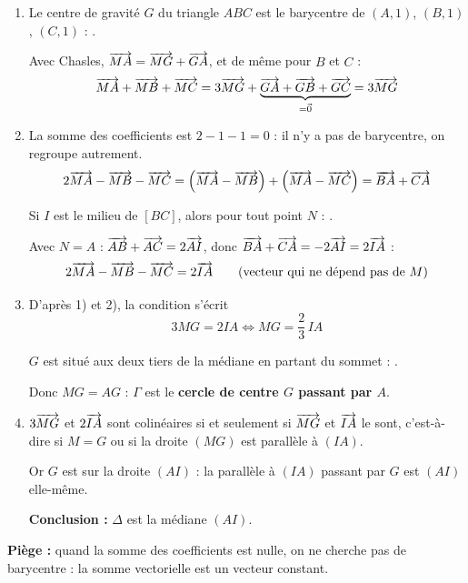 \begin{center}
\end{center}
\begin{enumerate}[itemsep=14pt]
  \item
  \begin{prop}
  Le centre de gravité $G$ du triangle $ABC$ est le barycentre de $(A,1)$, $(B,1)$, $(C,1)$ : .
  \end{prop}
  Avec Chasles, $\overrightarrow{MA}=\overrightarrow{MG}+\overrightarrow{GA}$, et de même pour $B$ et $C$ :
  \[\overrightarrow{MA}+\overrightarrow{MB}+\overrightarrow{MC}=3\overrightarrow{MG}+\underbrace{\overrightarrow{GA}+\overrightarrow{GB}+\overrightarrow{GC}}_{=\vec0}=3\overrightarrow{MG}\]

  \item La somme des coefficients est $2-1-1=0$ : il n'y a pas de barycentre, on regroupe autrement.
  \[2\overrightarrow{MA}-\overrightarrow{MB}-\overrightarrow{MC}=\left(\overrightarrow{MA}-\overrightarrow{MB}\right)+\left(\overrightarrow{MA}-\overrightarrow{MC}\right)=\overrightarrow{BA}+\overrightarrow{CA}\]
  \begin{prop}[Milieu]
  Si $I$ est le milieu de $[BC]$, alors pour tout point $N$ : .
  \end{prop}
  Avec $N=A$ : $\overrightarrow{AB}+\overrightarrow{AC}=2\overrightarrow{AI}$, donc $\overrightarrow{BA}+\overrightarrow{CA}=-2\overrightarrow{AI}=2\overrightarrow{IA}$ :
  \[2\overrightarrow{MA}-\overrightarrow{MB}-\overrightarrow{MC}=2\overrightarrow{IA}\qquad\text{(vecteur qui ne dépend pas de }M\text{)}\]

  \item D'après 1) et 2), la condition s'écrit
  \[3MG=2IA\iff MG=\dfrac23\,IA\]
  \begin{prop}
  $G$ est situé aux deux tiers de la médiane en partant du sommet : .
  \end{prop}
  Donc $MG=AG$ : $\Gamma$ est le \textbf{cercle de centre $G$ passant par $A$}.

  \item $3\overrightarrow{MG}$ et $2\overrightarrow{IA}$ sont colinéaires si et seulement si $\overrightarrow{MG}$ et $\overrightarrow{IA}$ le sont, c'est-à-dire si $M=G$ ou si la droite $(MG)$ est parallèle à $(IA)$.

  Or $G$ est sur la droite $(AI)$ : la parallèle à $(IA)$ passant par $G$ est $(AI)$ elle-même.

  \textbf{Conclusion :} $\Delta$ est la médiane $(AI)$.
\end{enumerate}
\textbf{Piège :} quand la somme des coefficients est nulle, on ne cherche pas de barycentre : la somme vectorielle est un vecteur constant.
